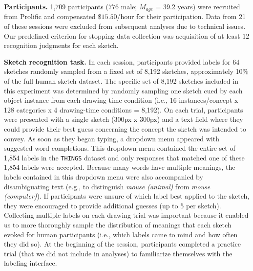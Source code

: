 \documentclass{article}
\begin{document}
\vspace{1em}
\textbf{Participants.}
1,709 participants (776 male; $M_{age}$ = 39.2 years) were recruited from Prolific and compensated $\$15.50$/hour for their participation. %
Data from 21 of these sessions were excluded from subsequent analyses due to technical issues.
Our predefined criterion for stopping data collection was acquisition of at least 12 recognition judgments for each sketch. 

\textbf{Sketch recognition task.}
In each session, participants provided labels for 64 sketches randomly sampled from a fixed set of 8,192 sketches, approximately 10\% of the full human sketch dataset. 
The specific set of 8,192 sketches included in this experiment was determined by randomly sampling one sketch cued by each object instance from each drawing-time condition (i.e., 16 instances/concept x 128 categories x 4 drawing-time conditions = 8,192). 
On each trial, participants were presented with a single sketch (300px x 300px) and a text field where they could provide their best guess concerning the concept the sketch was intended to convey. 
As soon as they began typing, a dropdown menu appeared with suggested word completions.
This dropdown menu contained the entire set of 1,854 labels in the \texttt{THINGS} dataset and only responses that matched one of these 1,854 labels were accepted. 
Because many words have multiple meanings, the labels contained in this dropdown menu were also accompanied by disambiguating text (e.g., to distinguish \textit{mouse (animal)} from \textit{mouse (computer)}). 
If participants were unsure of which label best applied to the sketch, they were encouraged to provide additional guesses (up to 5 per sketch). %
Collecting multiple labels on each drawing trial was important because it enabled us to more thoroughly sample the distribution of meanings that each sketch evoked for human participants (i.e., which labels came to mind and how often they did so). 
At the beginning of the session, participants completed a practice trial (that we did not include in analyses) to familiarize themselves with the labeling interface.
\end{document}
